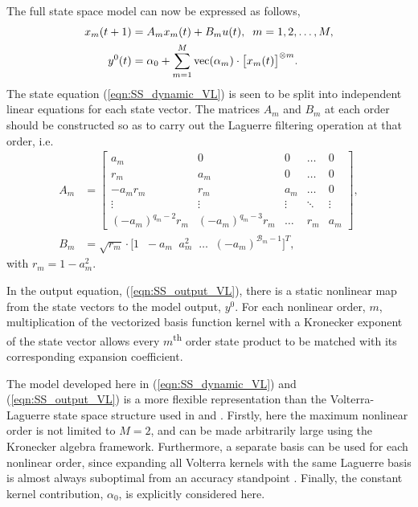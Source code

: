 The full state space model can now be expressed as follows,
\begin{align}
x_m(t+1) &= A_m x_m(t) + B_m u(t), \; \; m = 1,2,\hdots,M, \label{eqn:SS_dynamic_VL}\\
y^0(t) &= \alpha_0 + \sum_{m=1}^M \operatorname{vec}(\alpha_m) \cdot \big[ x_m(t) \big]^{\otimes m}. \label{eqn:SS_output_VL}
\end{align} 
The state equation (\ref{eqn:SS_dynamic_VL}) is seen to be split into independent linear equations for each state vector. The matrices $A_m$ and $B_m$ at each order should be constructed so as to carry out the Laguerre filtering operation at that order, i.e.
\begin{align}
A_m &= \begin{bmatrix} a_m & 0 &0 & \hdots &0 \\ r_m &a_m & 0 & \hdots &0 \\ -a_m r_m &r_m &a_m & \hdots &0 \\ \vdots & \vdots & \vdots & \ddots & \vdots \\ (-a_m)^{q_m-2}r_m & (-a_m)^{q_m-3}r_m & \hdots & r_m & a_m\end{bmatrix}, \\
B_m &= \sqrt{r_m} \cdot \big[1 \; \; -a_m \; \; a_m^2 \; \; \hdots \; \; (-a_m)^{\mathcal{B}_m-1} \big]^T,
\end{align}
with $r_m = 1-a_m^2$. 

In the output equation, (\ref{eqn:SS_output_VL}), there is a static nonlinear map from the state vectors to the model output, $y^0$. For each nonlinear order, $m$, multiplication of the vectorized basis function kernel with a Kronecker exponent of the state vector allows every $m$\textsuperscript{th} order state product to be matched with its corresponding expansion coefficient.

\begin{rem}
The model developed here in (\ref{eqn:SS_dynamic_VL}) and (\ref{eqn:SS_output_VL}) is a more flexible representation than the Volterra-Laguerre state space structure used in \cite{Parker1998} and \cite{Parker2002}. Firstly, here the maximum nonlinear order is not limited to $M=2$, and can be made arbitrarily large using the Kronecker algebra framework. Furthermore, a separate basis can be used for each nonlinear order, since expanding all Volterra kernels with the same Laguerre basis is almost always suboptimal from an accuracy standpoint \cite{Campello2004}. Finally, the constant kernel contribution, $\alpha_0$, is explicitly considered here.
\end{rem}

